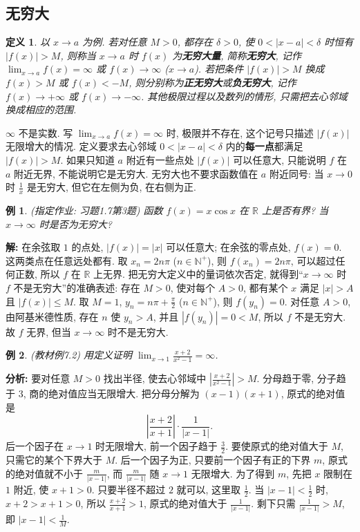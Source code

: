\documentclass[UTF8,openany]{ctexbook}
\theoremstyle{chinesetextbook}
\newtheorem{definition}{定义}[section]
\newtheorem{example}{例}[section]
\newenvironment{cnsolution}{\par\indent\textbf{解:} \ignorespaces}{\par}
\begin{document}
\subsection{无穷大}
\begin{definition}
以 $x\to a$ 为例. 若对任意 $M>0$, 都存在 $\delta>0$, 使 $0<|x-a|<\delta$ 时恒有 $|f(x)|>M$, 则称当 $x\to a$ 时 $f(x)$ 为\textbf{无穷大量}, 简称\textbf{无穷大}, 记作 $\displaystyle\lim_{x\to a}f(x)=\infty$ 或 $f(x)\to\infty$ ($x\to a$). 若把条件 $|f(x)|>M$ 换成 $f(x)>M$ 或 $f(x)<-M$, 则分别称为\textbf{正无穷大}或\textbf{负无穷大}, 记作 $f(x)\to+\infty$ 或 $f(x)\to-\infty$. 其他极限过程以及数列的情形, 只需把去心邻域换成相应的范围.
\end{definition}
$\infty$ 不是实数. 写 $\displaystyle\lim_{x\to a}f(x)=\infty$ 时, 极限并不存在, 这个记号只描述 $|f(x)|$ 无限增大的情况. 定义要求去心邻域 $0<|x-a|<\delta$ 内的\textbf{每一点}都满足 $|f(x)|>M$. 如果只知道 $a$ 附近有一些点处 $|f(x)|$ 可以任意大, 只能说明 $f$ 在 $a$ 附近无界, 不能说明它是无穷大. 无穷大也不要求函数值在 $a$ 附近同号: 当 $x\to0$ 时 $\displaystyle\frac1x$ 是无穷大, 但它在左侧为负, 在右侧为正.
\begin{example}
\textnormal{(指定作业: 习题1.7第3题)} 函数 $f(x)=x\cos x$ 在 $\mathbb R$ 上是否有界? 当 $x\to\infty$ 时是否为无穷大?
\end{example}
\begin{cnsolution}
在余弦取 $1$ 的点处, $|f(x)|=|x|$ 可以任意大; 在余弦的零点处, $f(x)=0$. 这两类点在任意远处都有. 取 $x_n=2n\pi$ ($n\in\mathbb N^+$), 则 $f(x_n)=2n\pi$, 可以超过任何正数, 所以 $f$ 在 $\mathbb R$ 上无界. 把无穷大定义中的量词依次否定, 就得到“$x\to\infty$ 时 $f$ 不是无穷大”的准确表述: 存在 $M>0$, 使对每个 $A>0$, 都有某个 $x$ 满足 $|x|>A$ 且 $|f(x)|\le M$. 取 $M=1$, $\displaystyle y_n=n\pi+\frac\pi2$ ($n\in\mathbb N^+$), 则 $f(y_n)=0$. 对任意 $A>0$, 由阿基米德性质, 存在 $n$ 使 $y_n>A$, 并且 $|f(y_n)|=0<M$, 所以 $f$ 不是无穷大. 故 $f$ 无界, 但当 $x\to\infty$ 时不是无穷大.
\end{cnsolution}
\begin{example}
\textnormal{(教材例7.2)} 用定义证明 $\displaystyle\lim_{x\to1}\frac{x+2}{x^2-1}=\infty$.
\end{example}
\par\indent\textbf{分析:} 要对任意 $M>0$ 找出半径, 使去心邻域中 $\displaystyle\left|\frac{x+2}{x^2-1}\right|>M$. 分母趋于零, 分子趋于 $3$, 商的绝对值应当无限增大. 把分母分解为 $(x-1)(x+1)$, 原式的绝对值是
\[
\left|\frac{x+2}{x+1}\right|\cdot\frac1{|x-1|}.
\]
后一个因子在 $x\to1$ 时无限增大, 前一个因子趋于 $\displaystyle\frac32$. 要使原式的绝对值大于 $M$, 只需它的某个下界大于 $M$. 后一个因子为正, 只要前一个因子有正的下界 $m$, 原式的绝对值就不小于 $\displaystyle\frac m{|x-1|}$, 而 $\displaystyle\frac m{|x-1|}$ 随 $x\to1$ 无限增大. 为了得到 $m$, 先把 $x$ 限制在 $1$ 附近, 使 $x+1>0$. 只要半径不超过 $2$ 就可以, 这里取 $\displaystyle\frac12$. 当 $\displaystyle|x-1|<\frac12$ 时, $x+2>x+1>0$, 所以 $\displaystyle\frac{x+2}{x+1}>1$, 原式的绝对值大于 $\displaystyle\frac1{|x-1|}$. 剩下只需 $\displaystyle\frac1{|x-1|}>M$, 即 $\displaystyle|x-1|<\frac1M$.
\end{document}
